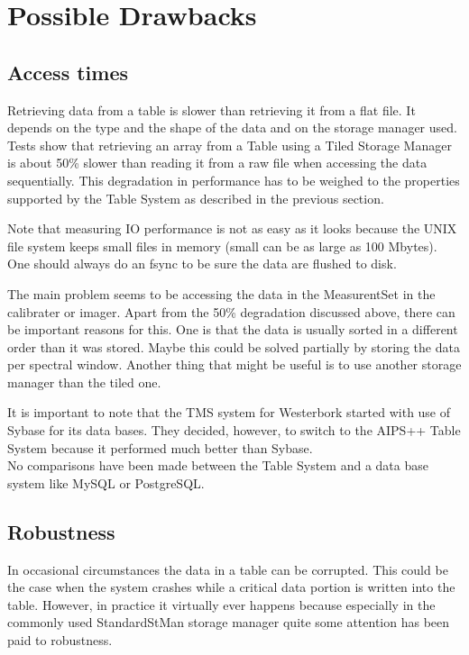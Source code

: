 \section{Possible Drawbacks}

\subsection{Access times}
Retrieving data from a table is slower than retrieving it from a flat
file. It depends on the type and the shape of the data and on the
storage manager used. Tests show that retrieving an array from a Table
using a Tiled Storage Manager is about 50\% slower than reading it
from a raw file when accessing the data sequentially.
This degradation in performance has to be weighed to the properties
supported by the Table System as described in the previous section.

Note that measuring IO performance is not as easy as it looks because
the UNIX file system keeps small files in memory (small can be as
large as 100 Mbytes). One should always do an fsync to be sure the
data are flushed to disk.

The main problem seems to be accessing the data in the MeasurentSet
in the calibrater or imager. Apart from the 50\% degradation discussed
above, there can be important reasons for this. One is that the data
is usually sorted in a different order than it was stored.
Maybe this could be solved partially by storing the data per spectral
window. Another thing that might be useful is to use another storage
manager than the tiled one.

It is important to note that the TMS system for Westerbork started
with use of Sybase for its data bases. They decided, however, to
switch to the AIPS++ Table System because it performed much better
than Sybase.
\\No comparisons have been made between the Table System and a
data base system like MySQL or PostgreSQL.

\subsection{Robustness}
In occasional circumstances the data in a table can be corrupted.
This could be the case when the system crashes while a critical data
portion is written into the table. However, in practice it
virtually ever happens because especially in the commonly used
StandardStMan storage manager quite some attention has been paid to
robustness.

